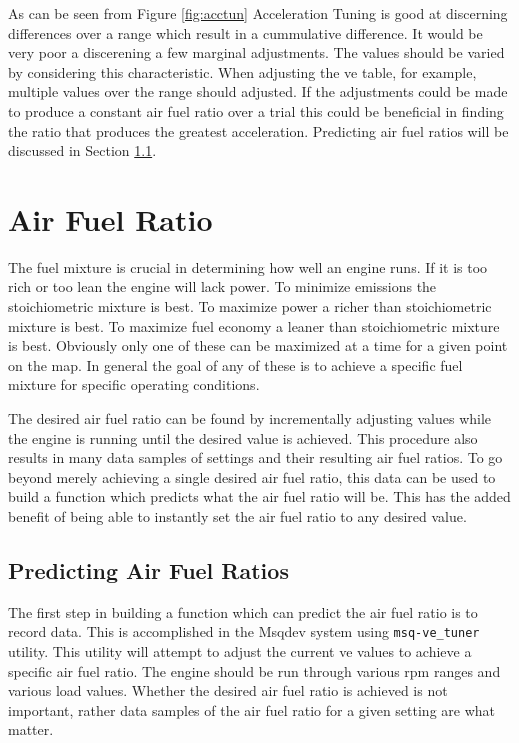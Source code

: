 \documentclass{article}
\begin{document}
As can be seen from Figure \ref{fig:acctun} Acceleration Tuning is good
at discerning differences over a range which result in a cummulative
difference.
It would be very poor a discerening a few marginal adjustments.
The values should be varied by considering this characteristic.
When adjusting the ve table, for example, multiple values over the
range should adjusted.
If the adjustments could be made to produce a constant air fuel ratio
over a trial this could be beneficial in finding the ratio that produces
the greatest acceleration.
Predicting air fuel ratios will be discussed in Section \ref{sec:predafr}.

\section{Air Fuel Ratio}
\label{sec:afr}

The fuel mixture is crucial in determining how well an engine runs.
If it is too rich or too lean the engine will lack power.
To minimize emissions the stoichiometric mixture is best.
To maximize power a richer than stoichiometric mixture is best.
To maximize fuel economy a leaner than stoichiometric mixture is best.
Obviously only one of these can be maximized at a time for a given
point on the map.
In general the goal of any of these is to achieve a specific fuel
mixture for specific operating conditions.

The desired air fuel ratio can be found by incrementally adjusting
values while the engine is running until the desired value is achieved.
This procedure also results in many data samples of settings and their
resulting air fuel ratios.
To go beyond merely achieving a single desired air fuel ratio, this data
can be used to build a function which predicts what the air
fuel ratio will be.
This has the added benefit of being able to instantly set the air fuel ratio
to any desired value.

\subsection{Predicting Air Fuel Ratios}
\label{sec:predafr}

The first step in building a function which can predict the air fuel ratio
is to record data.
This is accomplished in the Msqdev system using \verb+msq-ve_tuner+ utility.
This utility will attempt to adjust the current ve values to achieve
a specific air fuel ratio.
The engine should be run through various rpm ranges and various load values.
Whether the desired air fuel ratio is achieved is not important,
rather data samples of the air fuel ratio for a given setting are what
matter.
\end{document}
